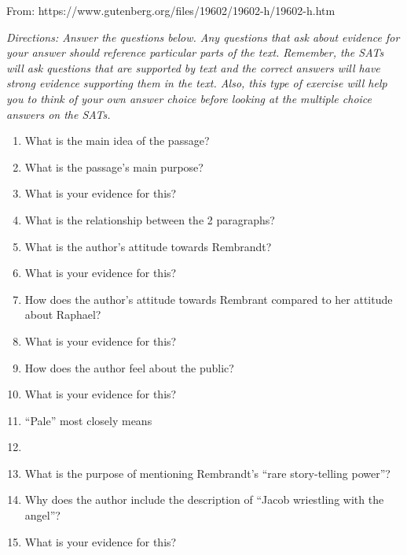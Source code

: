 From: https://www.gutenberg.org/files/19602/19602-h/19602-h.htm

\textit{Directions: Answer the questions below. Any questions that ask about evidence for your answer should reference particular parts of the text. Remember, the SATs will ask questions that are supported by text and the correct answers will have strong evidence supporting them in the text. Also, this type of exercise will help you to think of your own answer choice before looking at the multiple choice answers on the SATs.}

\begin{enumerate}

\item What is the main idea of the passage? \hrulefill

\item What is the passage's main purpose? \hrulefill

\item What is your evidence for this? \hrulefill

\item What is the relationship between the 2 paragraphs? \hrulefill

\item What is the author's attitude towards Rembrandt? \hrulefill

\item What is your evidence for this? \hrulefill

\item How does the author's attitude towards Rembrant compared to her attitude about Raphael? \hrulefill

\item What is your evidence for this? \hrulefill

\item How does the author feel about the public? \hrulefill

\item What is your evidence for this? \hrulefill

\item ``Pale'' most closely means \hrulefill

\item 

\item What is the purpose of mentioning Rembrandt's ``rare story-telling power''? \hrulefill

\item Why does the author include the description of ``Jacob wriestling with the angel''? \hrulefill

\item What is your evidence for this? \hrulefill

\end{enumerate}


